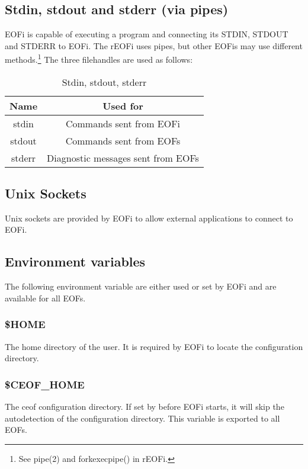 \documentclass[12pt,a4paper]{book}
\begin{document}
\subsection{Stdin, stdout and stderr (via pipes)}
EOFi is capable of executing a program and connecting its STDIN, STDOUT and
STDERR to EOFi. The rEOFi uses pipes, but other EOFis may use different
methods.\footnote{See pipe(2) and forkexecpipe() in rEOFi.}
The three filehandles are used as follows:
\begin{longtable}{|c|c|}
\caption{Stdin, stdout, stderr}\\
\hline
\textbf{Name} & \textbf{Used for}\\
\hline
stdin & Commands sent from EOFi\\
\hline
stdout & Commands sent from EOFs\\
\hline
stderr & Diagnostic messages sent from EOFs\\
\hline
\end{longtable}
\subsection{Unix Sockets}
Unix sockets are provided by EOFi to allow external applications to
connect to EOFi.
\subsection{Environment variables}
The following environment variable are either used or set by EOFi and are
available for all EOFs.
\subsubsection{\$HOME}
The home directory of the user. It is required by EOFi to locate the
configuration directory.
\subsubsection{\$CEOF\_HOME}
The ceof configuration directory. If set by before EOFi starts, it will
skip the autodetection of the configuration directory.
This variable is exported to all EOFs.
\end{document}
